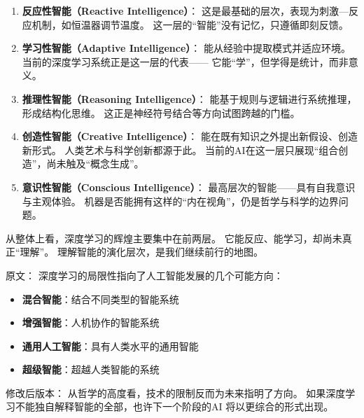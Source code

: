 \begin{enumerate}
\item \textbf{反应性智能（Reactive Intelligence）}：  
  这是最基础的层次，表现为刺激—反应机制，如恒温器调节温度。  
  这一层的“智能”没有记忆，只遵循即刻反馈。  

\item \textbf{学习性智能（Adaptive Intelligence）}：  
  能从经验中提取模式并适应环境。  
  当前的深度学习系统正是这一层的代表——  
  它能“学”，但学得是统计，而非意义。  

\item \textbf{推理性智能（Reasoning Intelligence）}：  
  能基于规则与逻辑进行系统推理，形成结构化思维。  
  这正是神经符号结合等方向试图跨越的门槛。  

\item \textbf{创造性智能（Creative Intelligence）}：  
  能在既有知识之外提出新假设、创造新形式。  
  人类艺术与科学创新都源于此。  
  当前的AI在这一层只展现“组合创造”，尚未触及“概念生成”。  

\item \textbf{意识性智能（Conscious Intelligence）}：  
  最高层次的智能——具有自我意识与主观体验。  
  机器是否能拥有这样的“内在视角”，仍是哲学与科学的边界问题。  
\end{enumerate}
从整体上看，深度学习的辉煌主要集中在前两层。  
它能反应、能学习，却尚未真正“理解”。  
理解智能的演化层次，是我们继续前行的地图。



原文：
深度学习的局限性指向了人工智能发展的几个可能方向：
\begin{itemize}
\item \textbf{混合智能}：结合不同类型的智能系统
\item \textbf{增强智能}：人机协作的智能系统
\item \textbf{通用人工智能}：具有人类水平的通用智能
\item \textbf{超级智能}：超越人类智能的系统
\end{itemize}
修改后版本：
从哲学的高度看，技术的限制反而为未来指明了方向。  
如果深度学习不能独自解释智能的全部，也许下一个阶段的AI  
将以更综合的形式出现。

